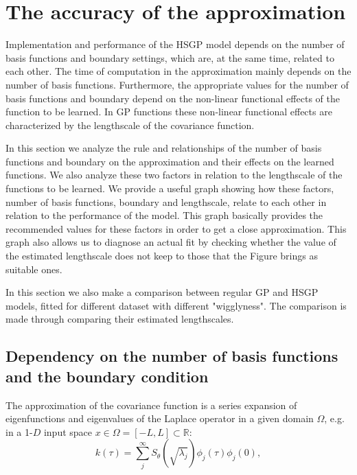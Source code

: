 \documentclass[]{interact}
\theoremstyle{plain}%
\theoremstyle{definition}
\theoremstyle{remark}
\begin{document}
\section{The accuracy of the approximation}

Implementation and performance of the HSGP model depends on the number of basis functions and boundary settings, which are, at the same time, related  to each other. The time of computation in the approximation mainly depends on the number of basis functions. Furthermore, the appropriate values for the number of basis functions and boundary depend on the non-linear functional effects of the function to be learned. In GP functions these non-linear functional effects are characterized by the lengthscale of the covariance function.

In this section we analyze the rule and relationships of the number of basis functions and boundary on the approximation and their effects on the learned functions. 
We also analyze these two factors in relation to the lengthscale of the functions to be learned. We provide a useful graph showing how these factors, number of basis functions, boundary and lengthscale, relate to each other in relation to the performance of the model. This graph basically provides the recommended values for these factors in order to get a close approximation. This graph also allows us to diagnose an actual fit by checking whether the value of the estimated lengthscale does not keep to those that the Figure brings as suitable ones.

In this section we also make a comparison between regular GP and HSGP models, fitted for different dataset with different "wigglyness". The comparison is made through comparing their estimated lengthscales. 

\subsection{Dependency on the number of basis functions and the boundary condition}

The approximation of the covariance function is a series expansion of eigenfunctions and eigenvalues of the Laplace operator in a given domain $\Omega$, e.g. in a 1-$D$ input space $x\in \Omega=[-L,L]\subset \mathbb{R}$:
%
\begin{equation}\label{diffcov}
k(\tau) = \sum_{j}^{\infty} S_{\theta}(\sqrt{\lambda_j}) \phi_j(\tau) \phi_j(0),  \nonumber
\end{equation} 
\end{document}
